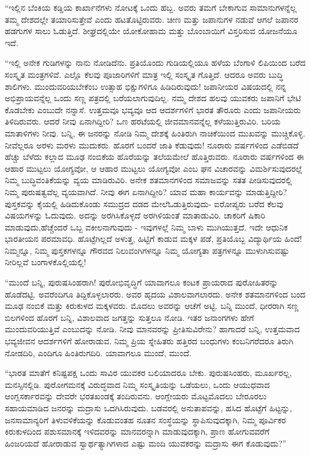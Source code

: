  “ಇಲ್ಲಿನ ಬೆಂಕಿಯ ಕಡ್ಡಿಯ ಕಾರ್ಖಾನೆಗಳು ನೋಟಕ್ಕೆ ಒಂದು ಹಬ್ಬ. ಅವರು ತಮಗೆ ಬೇಕಾಗುವ ಸಾಮಾನುಗಳನ್ನೆಲ್ಲ ತಮ್ಮ ದೇಶದಲ್ಲೇ ತಯಾರಿಸುತ್ತೇವೆ ಎಂದು ಹಟತೊಟ್ಟಿರುವರು. ಚೀಣ ಮತ್ತು ಜಪಾನುಗಳ ನಡುವೆ ಆಗಲೆ ಜಪಾನರ ಹಡಗುಗಳ ಸಾಲು ಓಡುತ್ತಿದೆ. ಶೀಘ್ರದಲ್ಲಿಯೇ ಯೋಕೋಹಾಮ ಮತ್ತು ಬೊಂಬಾಯಿಗೆ ವಿಸ್ತರಿಸುವ ಯೋಜನೆಯೂ ಇದೆ.

 “ಇಲ್ಲಿ ಅನೇಕ ಗುಡಿಗಳನ್ನು ನಾನು ನೋಡಿದೆನು. ಪ್ರತಿಯೊಂದು ಗುಡಿಯಲ್ಲಿಯೂ ಹಳೆಯ ಬೆಂಗಾಳಿ ಲಿಪಿಯಿಂದ ಬರೆದ ಸಂಸ್ಕೃತ ಮಂತ್ರಗಳಿವೆ. ಎಲ್ಲೊ ಕೆಲವು ಪೂಜಾರಿಗಳಿಗೆ ಮಾತ್ರ ಇಲ್ಲಿ ಸಂಸ್ಕೃತ ಗೊತ್ತಿದೆ. ಆದರೂ ಅವರು ಬುದ್ಧಿ ಶಾಲಿಗಳು. ಮುಂದುವರಿಯಬೇಕೆಂಬ ಉತ್ಸಾಹ ಭಿಕ್ಷುಗಳಿಗೂ ಹಿಡಿದಿರುವುದು! ಜಪಾನೀಯರ ವಿಷಯದಲ್ಲಿ ನನ್ನ ಅಭಿಪ್ರಾಯವನ್ನೆಲ್ಲ ಒಂದು ಸಣ್ಣ ಪತ್ರದಲ್ಲಿ ಬರೆಯಲಾಗುವುದಿಲ್ಲ. ನಮ್ಮ ದೇಶದ ಹಲವು ಯುವಕರು ಜಪಾನಿಗೆ ಭೇಟಿ ಕೊಡಬೇಕು ಎಂಬುದೇ ನನ್ನಾಸೆ. ಉತ್ತಮವೂ ಭವ್ಯವೂ ಆದ ಆದರ್ಶಗಳಿಗೆ ಭಾರತ ತೌರೂರು ಎಂದು ಜಪಾನೀಯರು ತಿಳಿದಿರುವರು. ಆದರೆ ನೀವು ಏನಾಗಿದ್ದೀರಿ? ಒಣ ಹರಟೆಯಲ್ಲಿ ಜೀವಮಾನವನ್ನೆಲ್ಲ ಕಳೆಯುತ್ತಿರುವಿರಿ. ಬರಿಯ ಮಾತಾಳಿಗಳು ನೀವು. ಬನ್ನಿ, ಈ ಜನರನ್ನು ನೋಡಿ ನಿಮ್ಮ ದೇಶಕ್ಕೆ ಹಿಂತಿರುಗಿ ನಾಚಿಕೆಯಿಂದ ಮುಖವನ್ನು ಮುಚ್ಚಿಕೊಳ್ಳಿ. ನೀವೆಲ್ಲರೂ ಅರಳು ಮರಳು ಮುದುಕರು. ಹೊರಗೆ ಬಂದರೆ ಜಾತಿ ಕೆಡುವುದು! ನೂರಾರು ವರ್ಷಗಳಿಂದ ಎಡೆಬಿಡದೆ ಹೆಚ್ಚು ಬೆಳೆದು ಕಲ್ಲಾದ ಮೂಢ ನಂಬಿಕೆಯ ಹೊರೆಯನ್ನು ತಲೆಯಮೇಲೆ ಹೊತ್ತಿರುವರು. ನೂರಾರು ವರ್ಷಗಳಿಂದ ಈ ಆಹಾರ ಮುಟ್ಟಲು ಯೋಗ್ಯವೋ, ಆ ಆಹಾರ ಮುಟ್ಟಲು ಯೋಗ್ಯವೋ ಎಂಬ ಘನ ವಿಚಾರವನ್ನು ವಿಮರ್ಶಿಸುವುದರಲ್ಲೆ ನಿಮ್ಮ ಬುದ್ಧಿವಂತಿಕೆಯನ್ನು ವ್ಯಯ ಮಾಡಿರುವಿರಿ. ಅನೇಕ ಶತಮಾನಗಳಿಂದ ಸಮಾಜವನ್ನು ಸತತ ಪೀಡಿಸುವುದರಲ್ಲಿ ನಿಮ್ಮ ಪುರುಷತ್ವವೆಲ್ಲ ವ್ಯಯವಾಗಿದೆ. ನೀವು ಈಗ ಏನಾಗಿದ್ದೀರಿ? ಯಾವ ಮಹಾ ಕಾರ್ಯವನ್ನು ಮಾಡುತ್ತಿದ್ದೀರಿ? ಪುಸ್ತಕವನ್ನು ಕೈಯಲ್ಲಿ ಹಿಡಿದುಕೊಂಡು ಸಮುದ್ರದ ದಡದ ಮೇಲೆ\break ಓಡುತ್ತಿರುವುದು- ಐರೋಪ್ಯರು ಬರೆದ ಕೆಲವು ವಿಷಯಗಳನ್ನು ಓದುವುದು. ಅದನ್ನು ಅರಗಿಸಿಕೊಳ್ಳದೆ ಅರಗಿಳಿಯಂತೆ ಮಾತಾಡುವಿರಿ. ಚಾಕರಿಗೆ ಷಿಕಾರಿ ಮಾಡುವುದು,\break ಹೆಚ್ಚೆಂದರೆ ಒಬ್ಬ ವಕೀಲನಾಗುವುದು - ಇವುಗಳಲ್ಲೆ ನಿಮ್ಮ ಬಾಳು ಮುಗಿಯುತ್ತದೆ. ಇದೇ ಆಧುನಿಕ ಭಾರತೀಯನ ಪರಮಾವಧಿ. ಹೊಟ್ಟೆಗಿಲ್ಲದೆ ಅಳುತ್ತ, ಹಿಟ್ಟಿಗೆ ಕಾಡುವ ಮಕ್ಕಳ ಪಡೆ, ಪ್ರತಿಯೊಬ್ಬ ವಿದ್ಯಾರ್ಥಿಯ ಹಿಂದೆ! ನಿಮ್ಮನ್ನೂ, ನಿಮ್ಮ ಪುಸ್ತಕಗಳನ್ನೂ ಗೌರವದ ನಿಲುವಂಗಿಗಳನ್ನೂ ನಿಮ್ಮ ಯೋಗ್ಯತಾ ಪತ್ರಗಳನ್ನೂ ಮುಳುಗಿಸುವಷ್ಟು ನೀರಿಲ್ಲವೆ ಬಂಗಾಳಕೊಲ್ಲಿಯಲ್ಲಿ!

 “ಮುಂದೆ ಬನ್ನಿ, ಪುರುಷಸಿಂಹರಾಗಿ! ಪುರೋಭಿವೃದ್ಧಿಗೆ ಯಾವಾಗಲೂ ಕಂಟಕ ಪ್ರಾಯರಾದ ಪುರೋಹಿತರನ್ನು ಹೊಡೆದಟ್ಟಿ. ಅವರೆಂದಿಗೂ ತಿದ್ದಿಕೊಳ್ಳಲಾರರು. ಅವರ ಹೃದಯ ವಿಶಾಲವಾಗಲಾರದು. ಅನೇಕ ಶತಮಾನಗಳಿಂದ ಬಂದ ಮೂಢ ನಂಬಿಕೆ ಮತ್ತು ಕಿರುಕುಳದ ಮಕ್ಕಳವರು. ಮೊದಲು ಅವರನ್ನು ಆಚೆಗೆ ಅಟ್ಟಿ. ಬನ್ನಿ ಮುಂದೆ, ಧೀರರಾಗಿ ಸಣ್ಣ ಬಿಲಗಳಿಂದ ಹೊರಗೆ ಬನ್ನಿ, ವಿಶಾಲವಾದ ಜಗತ್ತನ್ನು ಸುತ್ತಲೂ ನೋಡಿ. ಇತರ ಜನಾಂಗಗಳು ಹೇಗೆ ಮುಂದುವರಿಯುತ್ತಿವೆ ಎಂಬುದನ್ನು ನೋಡಿ. ನೀವು ಮಾನವರನ್ನು ಪ್ರೀತಿಸುವಿರೇನು? ಹಾಗಾದರೆ ಬನ್ನಿ, ಉತ್ತಮವಾದ ಭವ್ಯಜೀವನ ಆದರ್ಶಗಳಿಗೆ ಹೋರಾಡುವ. ನಿಮ್ಮ ಪ್ರಿಯ ಸ್ನೇಹಿತರು ಹತ್ತಿರದ ಬಂಧುಗಳು ಕಂಬನಿಗರೆದರೂ ತಿರುಗಿ ನೋಡದಿರಿ, ಎಂದಿಗೂ ಹಿಂತಿರುಗದಿರಿ. ಯಾವಾಗಲೂ ಮುಂದೆ, ಮುಂದೆ.

 “ಭಾರತ ಮಾತೆಗೆ ಕನಿಷ್ಟಪಕ್ಷ ಒಂದು ಸಾವಿರ ಯುವಕರ ಬಲಿಯಾದರೂ ಬೇಕು. ಪುರುಷಸಿಂಹರು, ಮೂರ್ಖರಲ್ಲ, ಮನಸ್ಸಿನಲ್ಲಿಡಿ. ಪುರೋಗಮನಕ್ಕೆ ವಿರುದ್ಧವಾದ ನಿಮ್ಮ ಸಂಸ್ಕೃತಿಯನ್ನು ಒಡೆಯಲು, ಒಂದು ಆಯುಧವಾದ ಆಂಗ್ಲಸರ್ಕಾರವನ್ನು ದೇವರೇ ಭರತಖಂಡಕ್ಕೆ ತಂದಿರುವನು. ಆಂಗ್ಲೇಯರು ಮೊಟ್ಟಮೊದಲು ಬೇರೂರಲು ಸಹಾಯಮಾಡಿದ ಜನರನ್ನು ಮದ್ರಾಸು ಒದಗಿಸಿರುವುದು. ಬಡವರಲ್ಲಿ ಅನುತಾಪವನ್ನು, ಹಸಿದ ಹೊಟ್ಟೆಗೆ ಹಿಟ್ಟನ್ನು, ಜನಸಾಮಾನ್ಯರಿಗೆ ತಿಳುವಳಿಕೆಯನ್ನು ಕೊಡುವಂತಹ ನೂತನ ಸಂಸ್ಥೆಯನ್ನು ಸ್ಥಾಪಿಸುವುದಕ್ಕಾಗಿ, ನಿಮ್ಮ ಪೂರ್ವಿಕರ ಕಿರುಕುಳದಿಂದ ಪಶುಸಮಾನಕ್ಕೆ ಇಳಿದವರನ್ನು ಮಾನವರನ್ನಾಗಿ ಮಾಡುವುದಕ್ಕಾಗಿ, ಪ್ರಾಣ ಹೋಗುವವರೆಗೆ ಹಿಂಜರಿಯದೆ ಹೋರಾಡುವ ಸ್ವಾರ್ಥತ್ಯಾಗಿಗಳಾದ ಎಷ್ಟು ಮಂದಿ ಯುವಕರನ್ನು ಮದ್ರಾಸು ಈಗ ಕೊಡುವುದು?” 

